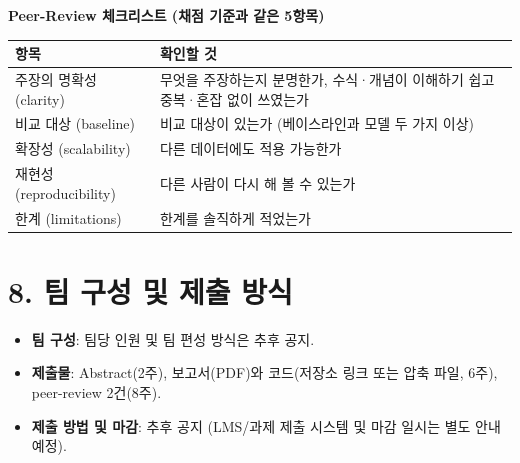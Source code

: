 \documentclass[12pt]{article}
\begin{document}
\vspace{4pt}
\noindent\begin{minipage}{\linewidth}
\noindent\textbf{Peer-Review 체크리스트 (채점 기준과 같은 5항목)}
\begin{center}
\small
\begin{tabular}{@{}>{\raggedright\arraybackslash}p{4.0cm}>{\raggedright\arraybackslash}p{8.6cm}@{}}
\toprule
항목 & 확인할 것 \\
\midrule
주장의 명확성 (clarity) & 무엇을 주장하는지 분명한가, 수식·개념이 이해하기 쉽고 중복·혼잡 없이 쓰였는가 \\
비교 대상 (baseline) & 비교 대상이 있는가 (베이스라인과 모델 두 가지 이상) \\
확장성 (scalability) & 다른 데이터에도 적용 가능한가 \\
재현성 (reproducibility) & 다른 사람이 다시 해 볼 수 있는가 \\
한계 (limitations) & 한계를 솔직하게 적었는가 \\
\bottomrule
\end{tabular}
\end{center}
\end{minipage}

\section*{8. 팀 구성 및 제출 방식}
\begin{itemize}
\item \textbf{팀 구성}: 팀당 인원 및 팀 편성 방식은 추후 공지.
\item \textbf{제출물}: Abstract(2주), 보고서(PDF)와 코드(저장소 링크 또는 압축
  파일, 6주), peer-review 2건(8주).
\item \textbf{제출 방법 및 마감}: 추후 공지 (LMS/과제 제출 시스템
  및 마감 일시는 별도 안내 예정).
\end{itemize}
\end{document}
